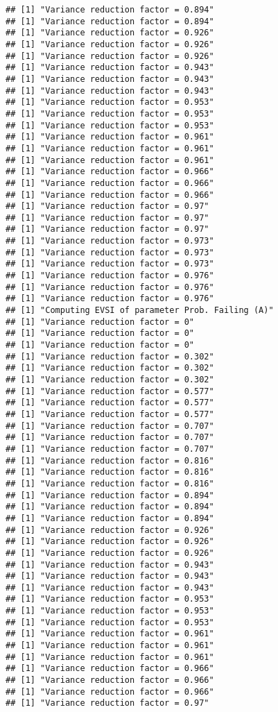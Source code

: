 \documentclass[
]{article}
\begin{document}
\begin{verbatim}
## [1] "Variance reduction factor = 0.894"
## [1] "Variance reduction factor = 0.894"
## [1] "Variance reduction factor = 0.926"
## [1] "Variance reduction factor = 0.926"
## [1] "Variance reduction factor = 0.926"
## [1] "Variance reduction factor = 0.943"
## [1] "Variance reduction factor = 0.943"
## [1] "Variance reduction factor = 0.943"
## [1] "Variance reduction factor = 0.953"
## [1] "Variance reduction factor = 0.953"
## [1] "Variance reduction factor = 0.953"
## [1] "Variance reduction factor = 0.961"
## [1] "Variance reduction factor = 0.961"
## [1] "Variance reduction factor = 0.961"
## [1] "Variance reduction factor = 0.966"
## [1] "Variance reduction factor = 0.966"
## [1] "Variance reduction factor = 0.966"
## [1] "Variance reduction factor = 0.97"
## [1] "Variance reduction factor = 0.97"
## [1] "Variance reduction factor = 0.97"
## [1] "Variance reduction factor = 0.973"
## [1] "Variance reduction factor = 0.973"
## [1] "Variance reduction factor = 0.973"
## [1] "Variance reduction factor = 0.976"
## [1] "Variance reduction factor = 0.976"
## [1] "Variance reduction factor = 0.976"
## [1] "Computing EVSI of parameter Prob. Failing (A)"
## [1] "Variance reduction factor = 0"
## [1] "Variance reduction factor = 0"
## [1] "Variance reduction factor = 0"
## [1] "Variance reduction factor = 0.302"
## [1] "Variance reduction factor = 0.302"
## [1] "Variance reduction factor = 0.302"
## [1] "Variance reduction factor = 0.577"
## [1] "Variance reduction factor = 0.577"
## [1] "Variance reduction factor = 0.577"
## [1] "Variance reduction factor = 0.707"
## [1] "Variance reduction factor = 0.707"
## [1] "Variance reduction factor = 0.707"
## [1] "Variance reduction factor = 0.816"
## [1] "Variance reduction factor = 0.816"
## [1] "Variance reduction factor = 0.816"
## [1] "Variance reduction factor = 0.894"
## [1] "Variance reduction factor = 0.894"
## [1] "Variance reduction factor = 0.894"
## [1] "Variance reduction factor = 0.926"
## [1] "Variance reduction factor = 0.926"
## [1] "Variance reduction factor = 0.926"
## [1] "Variance reduction factor = 0.943"
## [1] "Variance reduction factor = 0.943"
## [1] "Variance reduction factor = 0.943"
## [1] "Variance reduction factor = 0.953"
## [1] "Variance reduction factor = 0.953"
## [1] "Variance reduction factor = 0.953"
## [1] "Variance reduction factor = 0.961"
## [1] "Variance reduction factor = 0.961"
## [1] "Variance reduction factor = 0.961"
## [1] "Variance reduction factor = 0.966"
## [1] "Variance reduction factor = 0.966"
## [1] "Variance reduction factor = 0.966"
## [1] "Variance reduction factor = 0.97"

\end{verbatim}
\end{document}
